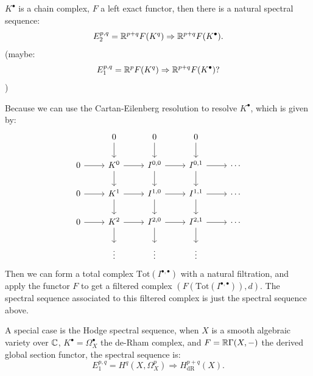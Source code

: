 \begin{examp}
  $K^{\bullet}$ is a chain complex, $F$ a left exact functor, then there is a natural spectral sequence:
  \[E^{p,q}_2 =\mathbb{R}^{p+q} F(K^{q}) \Rightarrow \mathbb{R}^{p+q} F(K^{\bullet}).\]
  (maybe:
  \[E^{p,q}_1 = \mathbb{R}^{p} F(K^{q}) \Rightarrow \mathbb{R}^{p+q} F(K^{\bullet})?\])

  Because we can use the Cartan-Eilenberg resolution to resolve $K^{\bullet}$, which is given by:
  \[
  \begin{tikzcd}
    & 0 \arrow[d] & 0 \arrow[d] & 0 \arrow[d] & \\
    0 \arrow[r] & K^0 \arrow[r] \arrow[d] & I^{0,0} \arrow[r] \arrow[d] & I^{0,1} \arrow[r] \arrow[d] & \cdots \\
    0 \arrow[r] & K^1 \arrow[r] \arrow[d] & I^{1,0} \arrow[r] \arrow[d] & I^{1,1} \arrow[r] \arrow[d] & \cdots \\
    0 \arrow[r] & K^2 \arrow[r] \arrow[d] & I^{2,0} \arrow[r] \arrow[d] & I^{2,1} \arrow[r] \arrow[d] & \cdots \\
    & \vdots & \vdots & \vdots &
  \end{tikzcd}
  \]
  Then we can form a total complex $\mathrm{Tot}(I^{\bullet,\bullet})$ with a natural filtration, and apply the functor $F$ to get a filtered complex $(F(\mathrm{Tot}(I^{\bullet,\bullet})),d)$. The spectral sequence associated to this filtered complex is just the spectral sequence above.

  A special case is the Hodge spectral sequence, when $X$ is a smooth algebraic variety over $\mathbb{C}$, $K^{\bullet} = \Omega^{\bullet}_X$ the de-Rham complex, and $F = \mathbb{R} \Gamma(X,-)$ the derived global section functor, the spectral sequence is:
  \[E^{p,q}_1 = H^q(X,\Omega^p_X) \Rightarrow H^{p+q}_{\mathrm{dR}}(X).\]
\end{examp}





